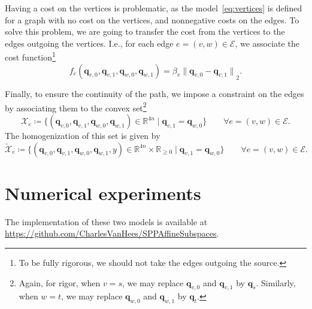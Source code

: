 \documentclass[a4paper, 12pt]{article}
\newlength{\indentsize}
\begin{document}
\hspace{\indentsize} Having a cost on the vertices is problematic, as the model~\ref{eq:vertices} is defined for a graph with no cost on the vertices, and nonnegative costs on the edges. To solve this problem, we are going to transfer the cost from the vertices to the edges outgoing the vertices. I.e., for each edge $e = (v,w) \in \mathcal{E}$, we associate the cost function\footnote{To be fully rigorous, we should not take the edges outgoing the source.} \[f_e(\mathbf{q}_{v,0}, \mathbf{q}_{v,1}, \mathbf{q}_{w,0}, \mathbf{q}_{w,1}) = \beta_v {\lVert \mathbf{q}_{v,0} - \mathbf{q}_{v,1} \rVert}_2.\]

Finally, to ensure the continuity of the path, we impose a constraint on the edges by associating them to the convex set\footnote{Again, for rigor, when $v = s$, we may replace $\mathbf{q}_{v,0}$ and $\mathbf{q}_{v,1}$ by $\mathbf{q}_s$. Similarly, when $w = t$, we may replace $\mathbf{q}_{w,0}$ and $\mathbf{q}_{w,1}$ by $\mathbf{q}_t$.} \[\mathcal{X}_e \coloneq \{(\mathbf{q}_{v,0}, \mathbf{q}_{v,1}, \mathbf{q}_{w,0}, \mathbf{q}_{w,1}) \in \mathbb{R}^{4n} \mid \mathbf{q}_{v,1} = \mathbf{q}_{w,0}\} \qquad \forall e = (v,w) \in \mathcal{E}.\]
The homogenization of this set is given by \[\tilde{\mathcal{X}}_e \coloneq \{(\mathbf{q}_{v,0}, \mathbf{q}_{v,1}, \mathbf{q}_{w,0}, \mathbf{q}_{w,1}, y) \in \mathbb{R}^{4n} \times \mathbb{R}_{\geq 0} \mid \mathbf{q}_{v,1} = \mathbf{q}_{w,0}\} \qquad \forall e = (v,w) \in \mathcal{E}.\]

\section{Numerical experiments}\label{sec:experiments}
The implementation of these two models is available at \url{https://github.com/CharlesVanHees/SPPAffineSubspaces}.

\printbibliography{}
\end{document}
